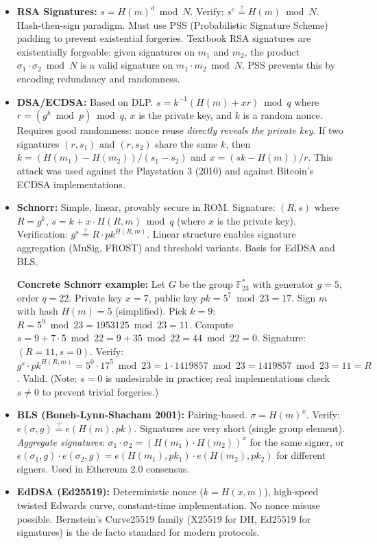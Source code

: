\begin{itemize}
\item \textbf{RSA Signatures:} $s = H(m)^d \bmod N$. Verify: $s^e \stackrel{?}{=} H(m) \bmod N$. Hash-then-sign paradigm. Must use PSS (Probabilistic Signature Scheme) padding to prevent existential forgeries. Textbook RSA signatures are existentially forgeable: given signatures on $m_1$ and $m_2$, the product $\sigma_1 \cdot \sigma_2 \bmod N$ is a valid signature on $m_1 \cdot m_2 \bmod N$. PSS prevents this by encoding redundancy and randomness.

\item \textbf{DSA/ECDSA:} Based on DLP. $s = k^{-1}(H(m) + xr) \bmod q$ where $r = (g^k \bmod p) \bmod q$, $x$ is the private key, and $k$ is a random nonce. Requires good randomness: nonce reuse \emph{directly reveals the private key}. If two signatures $(r, s_1)$ and $(r, s_2)$ share the same $k$, then $k = (H(m_1) - H(m_2)) / (s_1 - s_2)$ and $x = (sk - H(m))/r$. This attack was used against the Playstation 3 (2010) and against Bitcoin's ECDSA implementations.

\item \textbf{Schnorr:} Simple, linear, provably secure in ROM. Signature: $(R, s)$ where $R = g^k$, $s = k + x \cdot H(R, m) \bmod q$ (where $x$ is the private key). Verification: $g^s \stackrel{?}{=} R \cdot pk^{H(R,m)}$. Linear structure enables signature aggregation (MuSig, FROST) and threshold variants. Basis for EdDSA and BLS.

  \textbf{Concrete Schnorr example:} Let $G$ be the group $\mathbb{F}_{23}^*$ with generator $g = 5$, order $q = 22$. Private key $x = 7$, public key $pk = 5^7 \bmod 23 = 17$. Sign $m$ with hash $H(m) = 5$ (simplified). Pick $k = 9$: $R = 5^9 \bmod 23 = 1953125 \bmod 23 = 11$. Compute $s = 9 + 7 \cdot 5 \bmod 22 = 9 + 35 \bmod 22 = 44 \bmod 22 = 0$. Signature: $(R=11, s=0)$. Verify: $g^s \cdot pk^{H(R,m)} = 5^0 \cdot 17^5 \bmod 23 = 1 \cdot 1419857 \bmod 23 = 1419857 \bmod 23 = 11 = R$. Valid. (Note: $s=0$ is undesirable in practice; real implementations check $s \neq 0$ to prevent trivial forgeries.)

\item \textbf{BLS (Boneh-Lynn-Shacham 2001):} Pairing-based. $\sigma = H(m)^x$. Verify: $e(\sigma, g) \stackrel{?}{=} e(H(m), pk)$. Signatures are very short (single group element). \emph{Aggregate signatures}: $\sigma_1 \cdot \sigma_2 = (H(m_1) \cdot H(m_2))^x$ for the same signer, or $e(\sigma_1, g) \cdot e(\sigma_2, g) = e(H(m_1), pk_1) \cdot e(H(m_2), pk_2)$ for different signers. Used in Ethereum 2.0 consensus.

\item \textbf{EdDSA (Ed25519):} Deterministic nonce ($k = H(x, m)$), high-speed twisted Edwards curve, constant-time implementation. No nonce misuse possible. Bernstein's Curve25519 family (X25519 for DH, Ed25519 for signatures) is the de facto standard for modern protocols.
\end{itemize}


